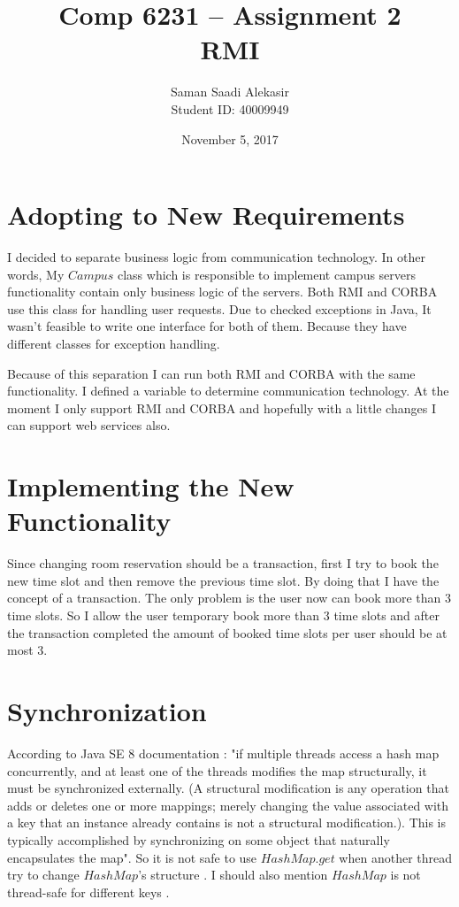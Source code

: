 \documentclass[12pt]{article}
\title{Comp 6231 -- Assignment 2\\RMI}
\author{Saman Saadi Alekasir\\Student ID: 40009949}
\date{November 5, 2017}
\begin{document}
\begin{titlepage}
\clearpage
{}
\maketitle
\thispagestyle{empty}
\end{titlepage}

\section{Adopting to New Requirements}
I decided to separate business logic from communication technology. In other words, My $Campus$ class which is responsible to implement campus servers functionality contain only business logic of the servers. Both RMI and CORBA use this class for handling user requests. Due to checked exceptions in Java, It wasn't feasible to write one interface for both of them. Because they have different classes for exception handling.
\par Because of this separation I can run both RMI and CORBA with the same functionality. I defined a variable to determine communication technology. At the moment I only support RMI and CORBA and hopefully with a little changes I can support web services also.

\section{Implementing the New Functionality}

Since changing room reservation should be a transaction, first I try to book the new time slot and then remove the previous time slot. By doing that I have the concept of a transaction. The only problem is the user now can book more than 3 time slots. So I allow the user temporary book more than 3 time slots and after the transaction completed the amount of booked time slots per user should be at most 3.

\section{Synchronization}
According to Java SE 8 documentation \cite{hashmap}: "if multiple threads access a hash map concurrently, and at least one of the threads modifies the map structurally, it must be synchronized externally. (A structural modification is any operation that adds or deletes one or more mappings; merely changing the value associated with a key that an instance already contains is not a structural modification.). This is typically accomplished by synchronizing on some object that naturally encapsulates the map". So it is not safe to use $HashMap.get$ when another thread try to change $HashMap$'s structure \cite{hashmap-multithread-get}. I should also mention $HashMap$ is not thread-safe for different keys \cite{hashmap-multithread-different-keys}.
\end{document}
